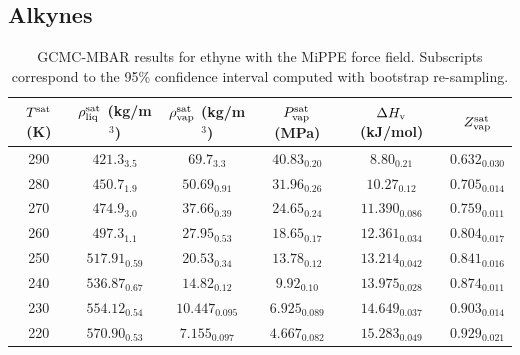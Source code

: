 \documentclass[journal=jctc,manuscript=article]{achemso}
\begin{document}
\subsection{Alkynes}

\begin{table}[htb!]
	\caption{GCMC-MBAR results for ethyne with the MiPPE force field. Subscripts correspond to the 95\% confidence interval computed with bootstrap re-sampling.}
	\begin{center}
		\begin{tabular}{|c|c|c|c|c|c|}
			\hline
			$T^{\rm sat}$ (K) & $\rho_{\rm liq}^{\rm sat}$ (kg/m$^3$) & $\rho_{\rm vap}^{\rm sat}$ (kg/m$^3$) & $P_{\rm vap}^{\rm sat}$ (MPa) & $\Delta H_{\rm v}$ (kJ/mol) & $Z_{\rm vap}^{\rm sat}$ \\ \hline
			290 & $421.3_{3.5}$ & $69.7_{3.3}$ & $40.83_{0.20}$ & $8.80_{0.21}$ & $0.632_{0.030}$ \\
			280 & $450.7_{1.9}$ & $50.69_{0.91}$ & $31.96_{0.26}$ & $10.27_{0.12}$ & $0.705_{0.014}$ \\
			270 & $474.9_{3.0}$ & $37.66_{0.39}$ & $24.65_{0.24}$ & $11.390_{0.086}$ & $0.759_{0.011}$ \\
			260 & $497.3_{1.1}$ & $27.95_{0.53}$ & $18.65_{0.17}$ & $12.361_{0.034}$ & $0.804_{0.017}$ \\
			250 & $517.91_{0.59}$ & $20.53_{0.34}$ & $13.78_{0.12}$ & $13.214_{0.042}$ & $0.841_{0.016}$ \\
			240 & $536.87_{0.67}$ & $14.82_{0.12}$ & $9.92_{0.10}$ & $13.975_{0.028}$ & $0.874_{0.011}$ \\
			230 & $554.12_{0.54}$ & $10.447_{0.095}$ & $6.925_{0.089}$ & $14.649_{0.037}$ & $0.903_{0.014}$ \\
			220 & $570.90_{0.53}$ & $7.155_{0.097}$ & $4.667_{0.082}$ & $15.283_{0.049}$ & $0.929_{0.021}$ \\
			\hline
		\end{tabular}
	\end{center}
\end{table}
\end{document}
